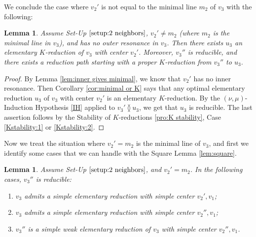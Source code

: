 \documentclass[reqno,oneside,11pt]{amsart}
\theoremstyle{plain}
\newtheorem{lemma}[theorem]{Lemma}
\theoremstyle{definition}
\renewcommand{\ne}{\between}
\begin{document}
We conclude the case where $v_2'$ is not equal to the minimal line $m_2$ of $v_3$ with the following:

\begin{lemma} \label{lem:v3' K reduction}
Assume Set-Up $\ref{setup:2 neighbors}$, $v_2'\neq m_2$ (where $m_2$ is the minimal line in $v_3$), and has no outer resonance in $v_3$.
Then there exists $u_3$ an elementary $K$-reduction of $v_3$ with center $v_2'$.
Moreover, $v_3''$ is reducible, and there exists a reduction path starting with a proper $K$-reduction from $v_3''$ to $u_3$.
\end{lemma}

\begin{proof}
By Lemma \ref{lem:inner gives minimal}, we know that $v_2'$ has no inner resonance.
Then Corollary \ref{cor:minimal or K} says that any optimal elementary reduction $u_3$ of $v_3$ with center $v_2'$ is an elementary $K$-reduction.
By the $(\nu,\mu)$-Induction Hypothesis \ref{IH} applied to $v_3' \ne u_3$, we get that $u_3$ is reducible.
The last assertion follows by the Stability of $K$-reductions \ref{pro:K
stability}, Case \ref{Kstability:1} or \ref{Kstability:2}.
\end{proof}

Now we treat the situation where $v_2' = m_2$ is the minimal line of $v_3$, and first we identify some cases that we can handle with the Square Lemma \ref{lem:square}.

\begin{lemma} \label{lem:easy}
Assume Set-Up $\ref{setup:2 neighbors}$, and $v_2' = m_2$.
In the following cases, $v_3''$ is reducible:
\begin{enumerate}
\item \label{case1:easy} $v_3$ admits a simple elementary reduction with simple center $v_2', v_1$;
\item \label{case2:easy} $v_3$ admits a simple elementary reduction with simple center $v_2'', v_1$;
\item \label{case3:easy} $v_3''$ is a simple weak elementary reduction of $v_3$ with simple center $v_2'', v_1$.
\end{enumerate}
\end{lemma}
\end{document}
